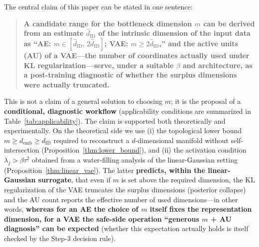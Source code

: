 \documentclass[make,article,submit,pdftex,moreauthors]{Definitions/mdpi}
\newcommand{\dID}{d_{\mathrm{ID}}}
\newcommand{\hatdID}{\hat{d}_{\mathrm{ID}}}
\newcommand{\demb}{d_{\mathrm{emb}}}
\begin{document}
The central claim of this paper can be stated in one sentence:
\begin{quote}
\textbf{A candidate range for the bottleneck dimension $m$ can be derived
from an estimate $\hatdID$ of the intrinsic dimension of the input data as
``AE: $m \in [\hatdID,\, 2\hatdID]$; VAE: $m \geq 2\hatdID$,'' and the
active units (AU) of a VAE---the number of coordinates actually used under
KL regularization---serve, under a suitable $\beta$ and architecture, as a
post-training diagnostic of whether the surplus dimensions were actually
truncated.}
\end{quote}
This is not a claim of a general solution to choosing $m$; it is the
proposal of a \textbf{conditional, diagnostic workflow}
(applicability conditions are summarized in Table~\ref{tab:applicability}).
The claim is supported both theoretically and experimentally.
On the theoretical side we use (i) the topological lower bound
$m \geq \demb \geq \dID$ required to reconstruct a $d$-dimensional manifold
without self-intersection (Proposition~\ref{thm:lower_bound}), and (ii) the
activation condition $\lambda_j > \beta\tau^2$ obtained from a water-filling
analysis of the linear-Gaussian setting
(Proposition~\ref{thm:linear_vae}).
The latter \textbf{predicts, within the linear-Gaussian surrogate}, that
even if $m$ is set above the required dimension, the KL regularization of
the VAE truncates the surplus dimensions (posterior collapse) and the AU
count reports the effective number of used dimensions---in other words,
\textbf{whereas for an AE the choice of $m$ itself fixes the representation
dimension, for a VAE the safe-side operation ``generous $m$ + AU
diagnosis'' can be expected} (whether this expectation actually holds is
itself checked by the Step-3 decision rule).
\end{document}

